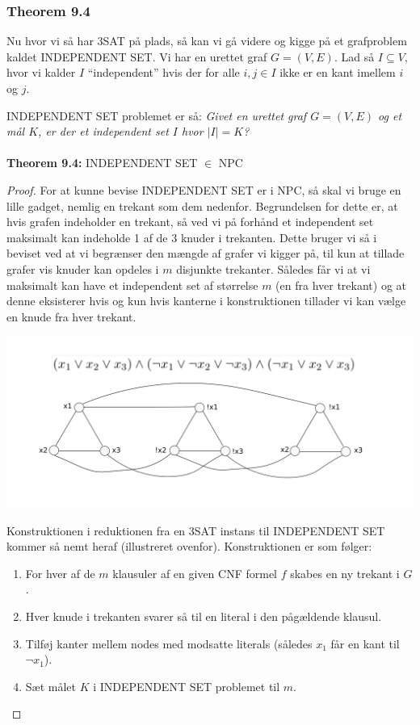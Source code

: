 \subsubsection{Theorem 9.4}

Nu hvor vi så har 3SAT på plads, så kan vi gå videre og kigge på et grafproblem kaldet INDEPENDENT SET. Vi har en urettet graf $G=(V,E)$. Lad så $I \subseteq V$, hvor vi kalder $I$ ``independent'' hvis der for alle $i,j \in I$ ikke er en kant imellem $i$ og $j$. 

INDEPENDENT SET problemet er så: \textit{Givet en urettet graf $G=(V,E)$ og et mål $K$, er der et independent set $I$ hvor $|I|=K$?}\\
~\\
\textbf{Theorem 9.4:} INDEPENDENT SET $\in$ NPC

\begin{proof}
 For at kunne bevise INDEPENDENT SET er i NPC, så skal vi bruge en lille gadget, nemlig en trekant som dem nedenfor. Begrundelsen for dette er, at hvis grafen indeholder en trekant, så ved vi på forhånd et independent set maksimalt kan indeholde 1 af de 3 knuder i trekanten. Dette bruger vi så i beviset ved at vi begrænser den mængde af grafer vi kigger på, til kun at tillade grafer vis knuder kan opdeles i $m$ disjunkte trekanter. Således får vi at vi maksimalt kan have et independent set af størrelse $m$ (en fra hver trekant) og at denne eksisterer hvis og kun hvis kanterne i konstruktionen tillader vi kan vælge en knude fra hver trekant.
 \begin{center}
 \includegraphics[bb=0 0 842 595,scale=0.5]{./INDEPENDENTSET.png}
\end{center}
Konstruktionen i reduktionen fra en 3SAT instans til INDEPENDENT SET kommer så nemt heraf (illustreret ovenfor). Konstruktionen er som følger:

\begin{enumerate}
 \item For hver af de $m$ klausuler af en given CNF formel $f$ skabes en ny trekant i $G$.
 \item Hver knude i trekanten svarer så til en literal i den pågældende klausul.
 \item Tilføj kanter mellem nodes med modsatte literals (således $x_1$ får en kant til $\neg x_1$).
 \item Sæt målet $K$ i INDEPENDENT SET problemet til $m$.
\end{enumerate}


\end{proof}
